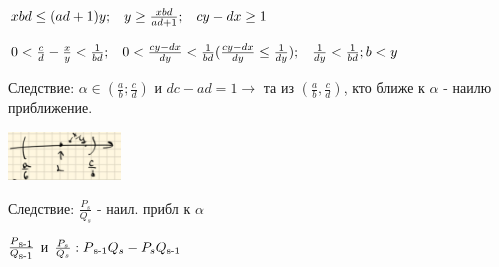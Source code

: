 \documentclass[12pt]{article}
\begin{document}
$xbd \leq (ad+1)y ; \hspace{2 ex} y \geq \frac{xbd}{ad+1} ;\hspace{2 ex} cy - dx \geq 1$

$0 < \frac{c}{d} - \frac{x}{y} < \frac{1}{bd} ;\hspace{2 ex} 0< \frac{cy - dx}{dy} < \frac{1}{bd} (\frac{cy - dx}{dy} \leq \frac{1}{dy}); \hspace{2 ex} \frac{1}{dy} < \frac{1}{bd} ; b<y$

Следствие: $\alpha \in (\frac{a}{b};\frac{c}{d})$ и $dc - ad = 1 \rightarrow$ та из $(\frac{a}{b}, \frac{c}{d})$, кто ближе к $\alpha$ - наилю приближение.

\includegraphics[width=30mm]{image3.png}

Следствие: $\frac{P_s}{Q_s} $ - наил. прибл к $\alpha$

$\frac{P\textsubscript{s-1}}{Q\textsubscript{s-1}}$ и $\frac{P_s}{Q_s} : P\textsubscript{s-1} Q_s - P_s Q\textsubscript{s-1}$
\end{document}
